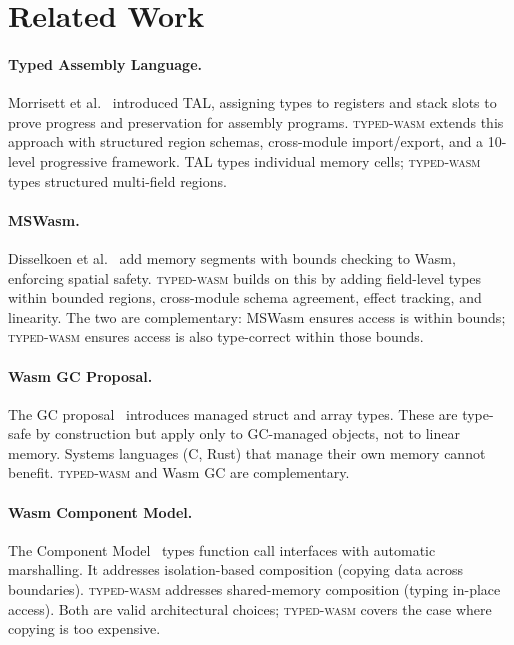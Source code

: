 \documentclass[11pt,a4paper]{article}
\newcommand{\typedwasm}{\textsc{typed-wasm}}
\begin{document}
\section{Related Work}
\label{sec:related}

\paragraph{Typed Assembly Language.}
Morrisett et al.~\cite{morrisett1999} introduced TAL, assigning types to
registers and stack slots to prove progress and preservation for assembly
programs.  \typedwasm{} extends this approach with structured region
schemas, cross-module import/export, and a 10-level progressive
framework.  TAL types individual memory cells; \typedwasm{} types
structured multi-field regions.

\paragraph{MSWasm.}
Disselkoen et al.~\cite{disselkoen2022} add memory segments with bounds
checking to Wasm, enforcing spatial safety.  \typedwasm{} builds on this
by adding field-level types within bounded regions, cross-module schema
agreement, effect tracking, and linearity.  The two are complementary:
MSWasm ensures access is within bounds; \typedwasm{} ensures access is
also type-correct within those bounds.

\paragraph{Wasm GC Proposal.}
The GC proposal~\cite{wasmgc2024} introduces managed struct and array
types.  These are type-safe by construction but apply only to GC-managed
objects, not to linear memory.  Systems languages (C, Rust) that manage
their own memory cannot benefit.  \typedwasm{} and Wasm GC are
complementary.

\paragraph{Wasm Component Model.}
The Component Model~\cite{wasmcomponent2024} types function call
interfaces with automatic marshalling.  It addresses isolation-based
composition (copying data across boundaries).  \typedwasm{} addresses
shared-memory composition (typing in-place access).  Both are valid
architectural choices; \typedwasm{} covers the case where copying is too
expensive.
\end{document}
